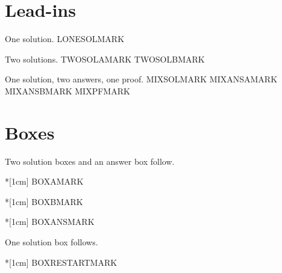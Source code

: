 \documentclass{didactic}
\begin{document}
\section{Lead-ins}

\begin{example}
	One solution.
	\solution LONESOLMARK
\end{example}

\begin{example}
	Two solutions.
	\solution TWOSOLAMARK
	\solution TWOSOLBMARK
\end{example}

\begin{example}
	One solution, two answers, one proof.
	\solution MIXSOLMARK
	\answer MIXANSAMARK
	\ans MIXANSBMARK
	\pf MIXPFMARK
\end{example}

\section{Boxes}

\begin{example}
	Two solution boxes and an answer box follow.
\end{example}
\begin{solution}*[1cm]
	BOXAMARK
\end{solution}
\begin{solution}*[1cm]
	BOXBMARK
\end{solution}
\begin{answer}*[1cm]
	BOXANSMARK
\end{answer}

\begin{example}
	One solution box follows.
\end{example}
\begin{solution}*[1cm]
	BOXRESTARTMARK
\end{solution}
\end{document}
